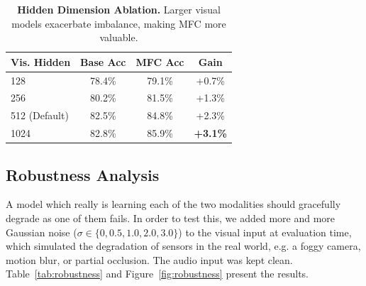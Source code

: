 \documentclass[10pt, twocolumn, letterpaper]{article}
\begin{document}
\begin{table}[h]
\centering
\begin{tabular}{@{}lccc@{}}
\toprule
\textbf{Vis. Hidden} & \textbf{Base Acc} & \textbf{MFC Acc} & \textbf{Gain} \\ \midrule
128 & 78.4\% & 79.1\% & +0.7\% \\
256 & 80.2\% & 81.5\% & +1.3\% \\
512 (Default) & 82.5\% & 84.8\% & +2.3\% \\
1024 & 82.8\% & 85.9\% & \textbf{+3.1\%} \\ \bottomrule
\end{tabular}
\caption{\textbf{Hidden Dimension Ablation.} Larger visual models exacerbate imbalance, making MFC more valuable.}
\label{tab:hidden_dim_main}
\end{table}

\subsection{Robustness Analysis}

A model which really is learning each of the two modalities should gracefully degrade as one of them fails. In order to test this, we added more and more Gaussian noise ($\sigma \in \{0, 0.5, 1.0, 2.0, 3.0\}$) to the visual input at evaluation time, which simulated the degradation of sensors in the real world, e.g. a foggy camera, motion blur, or partial occlusion. The audio input was kept clean. Table~\ref{tab:robustness} and Figure~\ref{fig:robustness} present the results.

\begin{table}[h]
\centering
{}
\caption{\textbf{Robustness to Visual Noise.} Accuracy (on the held-out validation set) as Gaussian noise of increasing standard deviation $\sigma$ is added to the visual input at test time. Clean audio is always available. The MFC and OGM-GE both achieve notably better resilience than the Baseline at moderate noise levels ($\sigma \leq 1.0$), confirming that their audio encoders have learned genuinely useful features rather than remaining dormant.}
\label{tab:robustness}
\end{table}
\end{document}
